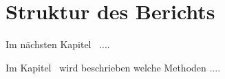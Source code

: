 

\section{Struktur des Berichts}

Im nächsten Kapitel~ ....

Im Kapitel~ wird beschrieben welche Methoden .... 

